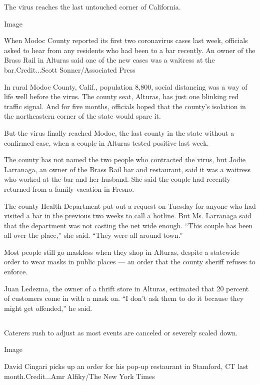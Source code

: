 The virus reaches the last untouched corner of California.

Image

When Modoc County reported its first two coronavirus cases last week,
officials asked to hear from any residents who had been to a bar
recently. An owner of the Brass Rail in Alturas said one of the new
cases was a waitress at the bar.Credit...Scott Sonner/Associated Press

In rural Modoc County, Calif., population 8,800, social distancing was a
way of life well before the virus. The county seat, Alturas, has just
one blinking red traffic signal. And for five months, officials hoped
that the county's isolation in the northeastern corner of the state
would spare it.

But the virus finally reached Modoc, the last county in the state
without a confirmed case, when a couple in Alturas tested positive last
week.

The county has not named the two people who contracted the virus, but
Jodie Larranaga, an owner of the Brass Rail bar and restaurant, said it
was a waitress who worked at the bar and her husband. She said the
couple had recently returned from a family vacation in Fresno.

The county Health Department put out a request on Tuesday for anyone who
had visited a bar in the previous two weeks to call a hotline. But Ms.
Larranaga said that the department was not casting the net wide enough.
``This couple has been all over the place,'' she said. ``They were all
around town.''

Most people still go maskless when they shop in Alturas, despite a
statewide order to wear masks in public places --- an order that the
county sheriff refuses to enforce.

Juan Ledezma, the owner of a thrift store in Alturas, estimated that 20
percent of customers come in with a mask on. ``I don't ask them to do it
because they might get offended,'' he said.

\hypertarget{-9}{%
\subsection{}\label{-9}}

Caterers rush to adjust as most events are canceled or severely scaled
down.

Image

David Cingari picks up an order for his pop-up restaurant in Stamford,
CT last month.Credit...Amr Alfiky/The New York Times

